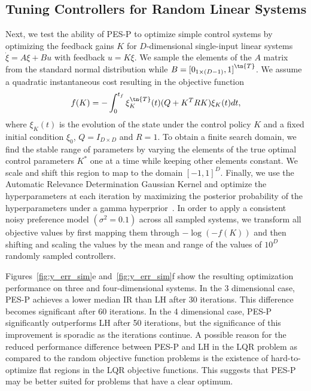 \subsection{Tuning Controllers for Random Linear Systems}
Next, we test the ability of PES-P to optimize simple control systems by
optimizing the feedback gains $K$ for $D$-dimensional single-input linear
systems $\dot{\xi} = A \xi + Bu$ with feedback $u = K \xi$. We sample the
elements of the $A$ matrix from the standard normal distribution while $B =
{[0_{1 \times (D-1)}, 1]}^\tn{T}$. We assume a quadratic instantaneous cost
resulting in the objective function
\begin{equation}
    f(K) = - \int_0^{t_f} \xi_K^\tn{T}(t) (Q + K^T R K) \xi_K(t) dt,
\end{equation}
where $\xi_K(t)$ is the evolution of the state under the control policy $K$ and
a fixed initial condition $\xi_0$, $Q = I_{D \times D}$ and $R = 1$. To obtain a
finite search domain, we find the stable range of parameters by varying the
elements of the true optimal control parameters $K^*$ one at a time while
keeping other elements constant. We scale and shift this region to map to the
domain ${[-1, 1]}^D$. Finally, we use the Automatic Relevance Determination
Gaussian Kernel and optimize the hyperparameters at each iteration by maximizing
the posterior probability of the hyperparameters under a gamma
hyperprior~\citep{chu2005preference,
williams2006gaussian}. In order to apply a consistent noisy preference model
$(\sigma^2 = 0.1)$ across all sampled systems, we transform all objective values
by first mapping them through $-\log(-f(K))$ and then shifting and scaling the
values by the mean and range of the values of $10^D$ randomly sampled
controllers. 

Figures~\ref{fig:y_err_sim}e and~\ref{fig:y_err_sim}f show the resulting
optimization performance on three and four-dimensional systems. In the 3
dimensional case, PES-P achieves a lower median IR than LH after 30 iterations.
This difference becomes significant after 60 iterations. In the 4 dimensional
case, PES-P significantly outperforms LH after 50 iterations, but the
significance of this improvement is sporadic as the iterations continue. A
possible reason for the reduced performance difference between PES-P and LH in
the LQR problem as compared to the random objective function problems is the
existence of hard-to-optimize flat regions in the LQR objective functions. This
suggests that PES-P may be better suited for problems that have a clear
optimum.

